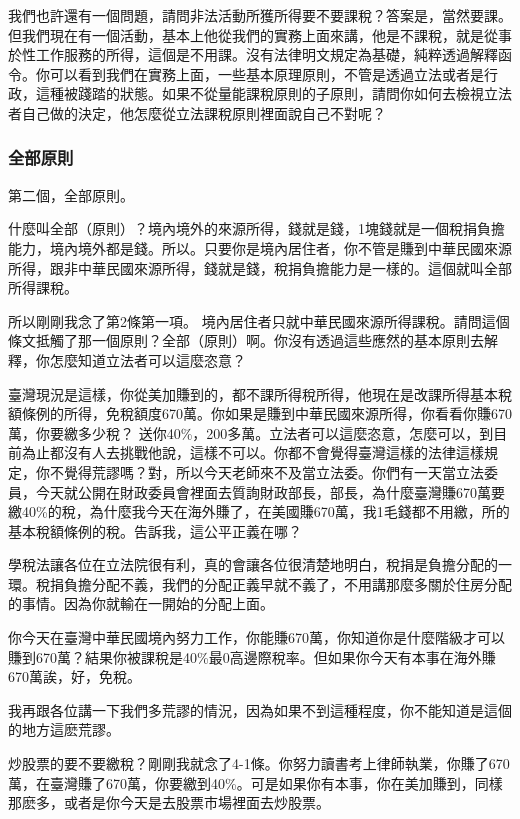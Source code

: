 \documentclass[oneside,sub3section]{ctexbook}
\begin{document}
我們也許還有一個問題，請問非法活動所獲所得要不要課稅？答案是，當然要課。但我們現在有一個活動，基本上他從我們的實務上面來講，他是不課稅，就是從事於性工作服務的所得，這個是不用課。沒有法律明文規定為基礎，純粹透過解釋函令。你可以看到我們在實務上面，一些基本原理原則，不管是透過立法或者是行政，這種被踐踏的狀態。如果不從量能課稅原則的子原則，請問你如何去檢視立法者自己做的決定，他怎麼從立法課稅原則裡面說自己不對呢？

\hypertarget{ux5168ux90e8ux539fux5247}{%
\subsubsection{全部原則}\label{ux5168ux90e8ux539fux5247}}

第二個，全部原則。

什麼叫全部（原則）？境內境外的來源所得，錢就是錢，1塊錢就是一個稅捐負擔能力，境內境外都是錢。所以。只要你是境內居住者，你不管是賺到中華民國來源所得，跟非中華民國來源所得，錢就是錢，稅捐負擔能力是一樣的。這個就叫全部所得課稅。

所以剛剛我念了第2條第一項。
境內居住者只就中華民國來源所得課稅。請問這個條文抵觸了那一個原則？全部（原則）啊。你沒有透過這些應然的基本原則去解釋，你怎麼知道立法者可以這麼恣意？

臺灣現況是這樣，你從美加賺到的，都不課所得稅所得，他現在是改課所得基本稅額條例的所得，免稅額度670萬。你如果是賺到中華民國來源所得，你看看你賺670萬，你要繳多少稅？ 送你40\%，200多萬。立法者可以這麼恣意，怎麼可以，到目前為止都沒有人去挑戰他說，這樣不可以。你都不會覺得臺灣這樣的法律這樣規定，你不覺得荒謬嗎？對，所以今天老師來不及當立法委。你們有一天當立法委員，今天就公開在財政委員會裡面去質詢財政部長，部長，為什麼臺灣賺670萬要繳40\%的稅，為什麼我今天在海外賺了，在美國賺670萬，我1毛錢都不用繳，所的基本稅額條例的稅。告訴我，這公平正義在哪？

學稅法讓各位在立法院很有利，真的會讓各位很清楚地明白，稅捐是負擔分配的一環。稅捐負擔分配不義，我們的分配正義早就不義了，不用講那麼多關於住房分配的事情。因為你就輸在一開始的分配上面。

你今天在臺灣中華民國境內努力工作，你能賺670萬，你知道你是什麼階級才可以賺到670萬？結果你被課稅是40\%最0高邊際稅率。但如果你今天有本事在海外賺670萬誒，好，免稅。

我再跟各位講一下我們多荒謬的情況，因為如果不到這種程度，你不能知道是這個的地方這麽荒謬。

炒股票的要不要繳稅？剛剛我就念了4-1條。你努力讀書考上律師執業，你賺了670萬，在臺灣賺了670萬，你要繳到40\%。可是如果你有本事，你在美加賺到，同樣那麽多，或者是你今天是去股票市場裡面去炒股票。
\end{document}
